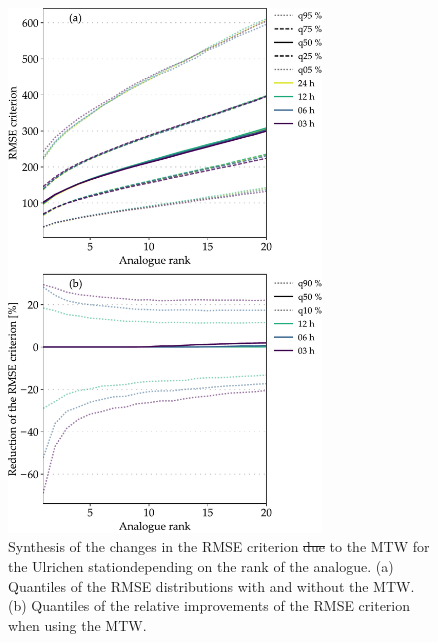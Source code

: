 \documentclass[hess, manuscript]{copernicus}
\providecommand{\DIFadd}[1]{{\protect\color{blue}\uwave{#1}}} %
\providecommand{\DIFdel}[1]{{\protect\color{red}\sout{#1}}}                      %
\providecommand{\DIFaddFL}[1]{\DIFadd{#1}} %
\providecommand{\DIFdelFL}[1]{\DIFdel{#1}} %
\providecommand{\DIFaddbeginFL}{} %
\providecommand{\DIFaddendFL}{} %
\providecommand{\DIFdelbeginFL}{} %
\providecommand{\DIFdelendFL}{} %
\begin{document}
	\begin{figure}[htb]
		\DIFaddendFL \begin{center}
			\DIFdelbeginFL %
\DIFdelendFL \DIFaddbeginFL \includegraphics[width=8.3cm]{fig08.pdf}
		\DIFaddendFL \end{center}
		\caption{Synthesis of the changes in the RMSE criterion \DIFdelbeginFL \DIFdelFL{due }\DIFdelendFL \DIFaddbeginFL \DIFaddFL{owing }\DIFaddendFL to the MTW for the Ulrichen station\DIFaddbeginFL \DIFaddFL{, }\DIFaddendFL depending on the rank of the analogue. (a) Quantiles of the RMSE distributions with and without the MTW. (b) Quantiles of the relative improvements of the RMSE criterion when using the MTW.}
		\label{fig:changes_RMSE}
	\end{figure}
\end{document}
